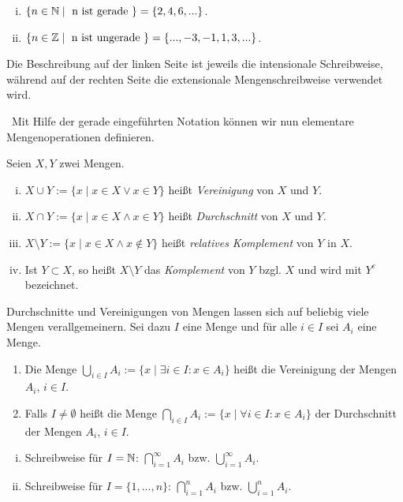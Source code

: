\begin{example}
    \begin{enumerate}[(i)]
        \item 
        $\{n \in \mathbb{N} \mid \text{ n ist gerade } \} = \{2,4,6,...\}$. 
        \item 
        $\{n \in \mathbb{Z} \mid \text{ n ist ungerade } \} = \{...,-3,-1,1,3,...\}$. 
    \end{enumerate}   
    Die Beschreibung auf der linken Seite ist jeweils die intensionale Schreibweise, während auf der rechten Seite die extensionale Mengenschreibweise verwendet wird. 
\end{example}\ 
Mit Hilfe der gerade eingeführten Notation können wir nun elementare Mengenoperationen definieren. 

\begin{mydef}
    Seien $X,Y$ zwei Mengen. 
    \begin{enumerate}[(i)]
        \item  
        $X \cup Y := \{x \mid x \in X \vee x \in Y\}$ heißt \textit{Vereinigung} von $X$ und $Y$. 
        \item 
        $X \cap Y := \{x \mid x \in X \wedge x \in Y\}$ heißt \textit{Durchschnitt} von $X$ und $Y$. 
        \item 
        $X \setminus Y := \{x \mid x \in X \wedge x \notin Y\}$ heißt \textit{relatives Komplement} von $Y$ in $X$. 
        \item 
        Ist $Y \subset X$, so heißt $X \setminus Y$ das \textit{Komplement} von $Y$ bzgl. $X$ und wird mit $Y^c$ bezeichnet. 
    \end{enumerate}
\end{mydef}

\begin{mydef}
    Durchschnitte und Vereinigungen von Mengen lassen sich auf beliebig viele Mengen verallgemeinern. 
    Sei dazu $I$ eine Menge und für alle $i \in I$ sei $A_i$ eine Menge. 
    \begin{enumerate}
        \item 
        Die Menge $\bigcup_{i \in I}A_i := \{x \mid \exists i \in I: x \in A_i\}$ heißt die Vereinigung der Mengen $A_i$, $i \in I$. 
        \item 
        Falls $I \neq \emptyset$ heißt die Menge $\bigcap_{i \in I}A_i := \{x \mid \forall i \in I: x \in A_i\}$  der Durchschnitt der Mengen $A_i$, $i \in I$.

    \end{enumerate} 
\end{mydef}

\begin{remark}
    \begin{enumerate}[(i)]
        \item 
        Schreibweise für $I = \mathbb{N}$: $\bigcap_{i=1}^{\infty}A_i$ bzw. $\bigcup_{i=1}^{\infty}A_i$.
        \item 
        Schreibweise für $I = \{1,...,n\}$: $\bigcap_{i=1}^n A_i$ bzw. $\bigcup_{i=1}^n A_i$.
    \end{enumerate}
\end{remark}